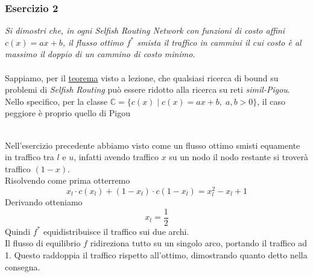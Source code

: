 \documentclass{article}
\begin{document}
            \subsubsection{Esercizio 2}
                \textit{Si dimostri che, in ogni Selfish Routing Network con funzioni di costo affini $ c(x) = ax + b $, il flusso ottimo $ f^* $ smista il traffico in cammini il cui costo è al massimo il doppio di un cammino di costo minimo.}\\
                \\
                Sappiamo, per il \href{https://theory.stanford.edu/~tim/f13/l/l11.pdf}{teorema} visto a lezione, che qualsiasi ricerca di bound su problemi di \textit{Selfish Routing} può essere ridotto alla ricerca su reti \textit{simil-Pigou}.\\
                Nello specifico, per la classe $ \mathbb{C} = \{c(x)\; \vert\; c(x) = ax + b,\; a,b > 0\} $, il caso peggiore è proprio quello di Pigou
                \begin{figure}[htb]\hspace*{\fill}%
                    \hspace*{\fill}
                \end{figure}\\
            Nell'esercizio precedente abbiamo visto come un flusso ottimo smisti equamente in traffico tra $ l $ e $ u $, infatti avendo traffico $ x $ su un nodo il nodo restante si troverà traffico $ (1 - x) $.\\
            Risolvendo come prima otterremo
            \[
                x_l \cdot c(x_l) + (1 - x_l) \cdot c(1 - x_l) = x_l^2  - x_l + 1
            \]
            Derivando otteniamo
            \[
                x_l = \frac{1}{2}    
            \]
            Quindi $ f^* $ equidistribuisce il traffico sui due archi.\\
            Il flusso di equilibrio $ f $ ridireziona tutto su un singolo arco, portando il traffico ad 1. Questo raddoppia il traffico rispetto all'ottimo, dimostrando quanto detto nella consegna.
        \newpage
\end{document}
